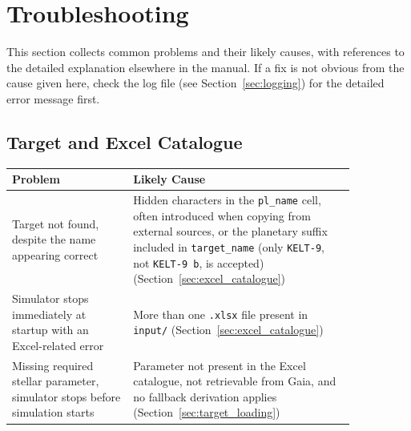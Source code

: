 \newpage


\section{Troubleshooting}
\label{sec:troubleshooting}

This section collects common problems and their likely causes, with references to the detailed explanation elsewhere in the manual. If a fix is not obvious from the cause given here, check the log file (see Section~\ref{sec:logging}) for the detailed error message first.

\subsection{Target and Excel Catalogue}

\begin{center}
    \begin{tabular}{p{0.30\linewidth} p{0.55\linewidth}}
        \toprule
        \textbf{Problem}                                                             & \textbf{Likely Cause}                                                                                                                                                                                                                                          \\
        \midrule
        Target not found, despite the name appearing correct                         & Hidden characters in the \texttt{pl\_name} cell, often introduced when copying from external sources, or the planetary suffix included in \texttt{target\_name} (only \texttt{KELT-9}, not \texttt{KELT-9 b}, is accepted) (Section~\ref{sec:excel_catalogue}) \\
        \midrule

        Simulator stops immediately at startup with an Excel-related error           & More than one \texttt{.xlsx} file present in \texttt{input/} (Section~\ref{sec:excel_catalogue})                                                                                                                                                               \\
        \midrule
        Missing required stellar parameter, simulator stops before simulation starts & Parameter not present in the Excel catalogue, not retrievable from Gaia, and no fallback derivation applies (Section~\ref{sec:target_loading})                                                                                                                 \\
        \bottomrule
    \end{tabular}
\end{center}

